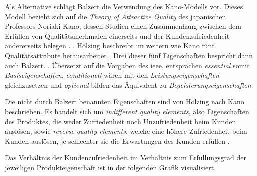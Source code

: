 Als Alternative schlägt Balzert die Verwendung des Kano-Modells vor. Dieses Modell bezieht sich auf die \textit{Theory of Attractive Quality} des japanischen Professors Noriaki Kano, dessen Studien einen Zusammenhang zwischen dem Erfüllen von Qualitätsmerkmalen einerseits und der Kundenzufriedenheit andererseits belegen \citep[vgl.][77]{Hoelzing2008}.  \citep[][78]{Hoelzing2008}. Hölzing beschreibt im weitern wie Kano fünf Qualitätsattribute herausarbeitet \citep[vgl.][82]{Hoelzing2008}. Drei dieser fünf Eigenschaften bespricht dann auch Balzert.
 \citep[][544]{Balzert2010}.
Übersetzt auf die Vorgaben des \ac{ieee}, entsprächen \textit{essential} somit \textit{Basiseigenschaften}, \textit{conditionell} wären mit den \textit{Leistungseigenschaften} gleichzusetzen und \textit{optional} bilden das Äquivalent zu \textit{Begeisterungseigenschaften}.

Die nicht durch Balzert benannten Eigenschaften sind von Hölzing nach Kano beschrieben. Es handelt sich um \textit{indifferent quality elements}, also Eigenschaften des Produktes, die weder Zufriedenheit noch Unzufriedenheit beim Kunden auslösen, sowie \textit{reverse quality elements}, welche eine höhere Zufriedenheit beim Kunden auslösen, je schlechter sie die Erwartungen des Kunden erfüllen \citep[vgl.][83]{Hoelzing2008}.

Das Verhältnis der Kundenzufriedenheit im Verhältnis zum Erfüllungsgrad der jeweiligen Produkteigenschaft ist in der folgenden Grafik visualisiert.

